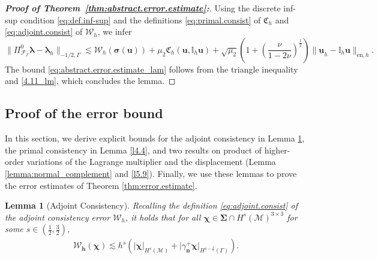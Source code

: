\documentclass[a4paper,11pt]{article}
\newtheorem{lemma}[theorem]{Lemma}
\theoremstyle{definition}
\theoremstyle{remark}
\newcommand{\uvec}[1]{\underline{\mathbf{#1}}}
\newcommand{\bo}[1]{\mathbf{#1}}
\newcommand{\bos}[1]{\boldsymbol{#1}}
\newcommand{\mI}[1]{\mathbb I_h\bo{#1}}
\def\bsig{\boldsymbol{\sigma}}
\def\cF{\mathcal{F}}
\def\cM{\mathcal{M}}
\def\cW{\mathcal{W}}
\def\fC{\mathfrak{C}}
\def\blambda{\boldsymbol{\lambda}}
\begin{document}
\begin{proof}[\textit{\textbf {Proof of Theorem~\ref{thm:abstract.error.estimate}:}}]
Using the discrete inf-sup condition \eqref{eq:def.inf-sup} and the definitions \eqref{eq:primal.consist} of $\bos{\fC}_h$ and  \eqref{eq:adjoint.consist} of $\bos{\cW}_h$, we infer
\begin{equation}\label{4.11_lm}
\lVert \Pi^0_{\cF_\Gamma}\blambda-\blambda_h\rVert_{-1/2,\Gamma}\lesssim \bos{\cW}_h(\bsig(\bo{u}))+\mu_{2}\bos{\fC}_h(\bo{u},\mI{u})+\sqrt{\mu_{2}}\left(1+\left(\frac{\nu}{1-2\nu}\right)^{\frac{1}{2}}\right)\lVert\uvec{u}_h-\mI{u}\rVert_{\mathrm{en},h}.
\end{equation}
 The bound \eqref{eq:abstract.error.estimate_lam} follows from the triangle inequality and  \eqref{4.11_lm}, which concludes the lemma. 
\end{proof}

\subsection{Proof of the error bound}

In this section, we derive explicit bounds for the adjoint consistency in Lemma \ref{lemma:adjoint_consistency}, the primal consistency in Lemma \ref{l4.4}, and two results on product of higher-order variations of the Lagrange multiplier and the displacement (Lemma \ref{lemma:normal_complement} and \ref{l5.9}). Finally, we use these lemmas to prove the error estimates of Theorem \ref{thm:error.estimate}.  

\begin{lemma}[Adjoint Consistency]\label{lemma:adjoint_consistency}
Recalling the definition \eqref{eq:adjoint.consist} of the adjoint consistency error $\bos{\cW}_h$, it holds that for all $ \bos{\chi}\in\bos{\Sigma} \cap H^s(\cM)^{3\times 3}$ for some $s\in(\frac{1}{2},\frac{3}{2})$,
\begin{align*}%
\bos{\cW_h(\bos{\chi})}\lesssim h^{s}\left(\lvert  \bos{\chi}\rvert_{H^s(\cM)}+\lvert \gamma_\bo{n}^+\bos{\chi} \rvert_{H^{s-\frac{1}{2}}(\Gamma)}\right).
\end{align*}
\end{lemma}
\end{document}
